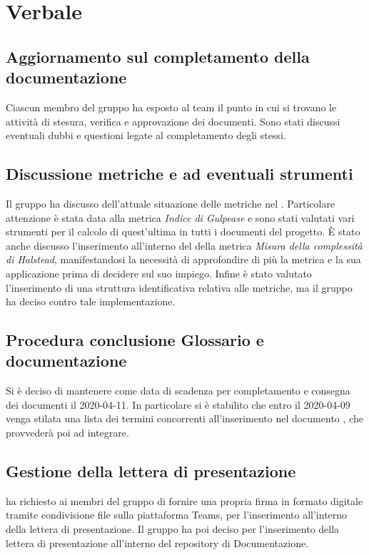 \section{Verbale}
	
	\subsection{Aggiornamento sul completamento della documentazione}
	Ciascun membro del gruppo ha esposto al team il punto in cui si trovano le attività di stesura, verifica e approvazione dei documenti. Sono stati discussi eventuali dubbi e questioni legate al completamento degli stessi.

	\subsection{Discussione metriche e ad eventuali strumenti}
	Il gruppo ha discusso dell'attuale situazione delle metriche nel \PdQ{}. Particolare attenzione è stata data alla metrica \textit{Indice di Gulpease} e sono stati valutati vari strumenti per il calcolo di quest'ultima in tutti i documenti del progetto. È stato anche discusso l'inserimento all'interno del \PdQ{} della metrica \textit{Misura della complessità di Halstead}, manifestandosi la necessità di approfondire di più la metrica e la sua applicazione prima di decidere sul suo impiego. Infine è stato valutato l'inserimento di una struttura identificativa relativa alle metriche, ma il gruppo ha deciso contro tale implementazione.

	\subsection{Procedura conclusione Glossario e documentazione}
	Si è deciso di mantenere come data di scadenza per completamento e consegna dei documenti il 2020-04-11. In particolare si è stabilito che entro il 2020-04-09 venga stilata una lista dei termini concorrenti all'inserimento nel documento \Glossario{}, che \AS{} provvederà poi ad integrare.
		
	\subsection{Gestione della lettera di presentazione}
	\VB{} ha richiesto ai membri del gruppo di fornire una propria firma in formato digitale tramite condivisione file sulla piattaforma Teams, per l'inserimento all'interno della lettera di presentazione. Il gruppo ha poi deciso per l'inserimento della lettera di presentazione all'interno del repository di Documentazione. 

